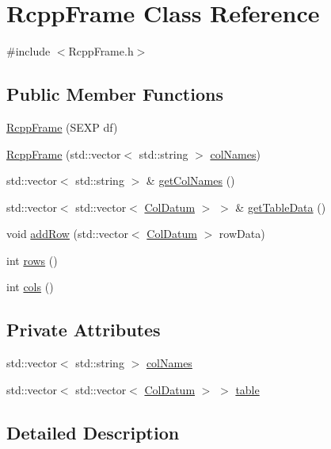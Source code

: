 \hypertarget{classRcppFrame}{
\section{RcppFrame Class Reference}
\label{classRcppFrame}
}


{\ttfamily \#include $<$RcppFrame.h$>$}\subsection*{Public Member Functions}
\begin{DoxyCompactItemize}
\item 
\hyperlink{classRcppFrame_a2aad548eb7d3842ea12da3c5a67bbfbc}{RcppFrame} (SEXP df)
\item 
\hyperlink{classRcppFrame_ad3caf84a0543c0f31a97705be8902358}{RcppFrame} (std::vector$<$ std::string $>$ \hyperlink{classRcppFrame_a9b549d377248896848b6abcb8df64f82}{colNames})
\item 
std::vector$<$ std::string $>$ \& \hyperlink{classRcppFrame_a63b20515817f4c3564e3da199e418fcd}{getColNames} ()
\item 
std::vector$<$ std::vector$<$ \hyperlink{classColDatum}{ColDatum} $>$ $>$ \& \hyperlink{classRcppFrame_ab18624be30cfa934ca0ad2152cff6d41}{getTableData} ()
\item 
void \hyperlink{classRcppFrame_aae72791527f2947a477633151106f42c}{addRow} (std::vector$<$ \hyperlink{classColDatum}{ColDatum} $>$ rowData)
\item 
int \hyperlink{classRcppFrame_aa33ab9553bb9fa510c338a3e092d9ace}{rows} ()
\item 
int \hyperlink{classRcppFrame_aac33f787068fe1bc6f97b2b4e08c9c5d}{cols} ()
\end{DoxyCompactItemize}
\subsection*{Private Attributes}
\begin{DoxyCompactItemize}
\item 
std::vector$<$ std::string $>$ \hyperlink{classRcppFrame_a9b549d377248896848b6abcb8df64f82}{colNames}
\item 
std::vector$<$ std::vector$<$ \hyperlink{classColDatum}{ColDatum} $>$ $>$ \hyperlink{classRcppFrame_a4de0bda5c0df650b2447a4c029af0302}{table}
\end{DoxyCompactItemize}


\subsection{Detailed Description}


